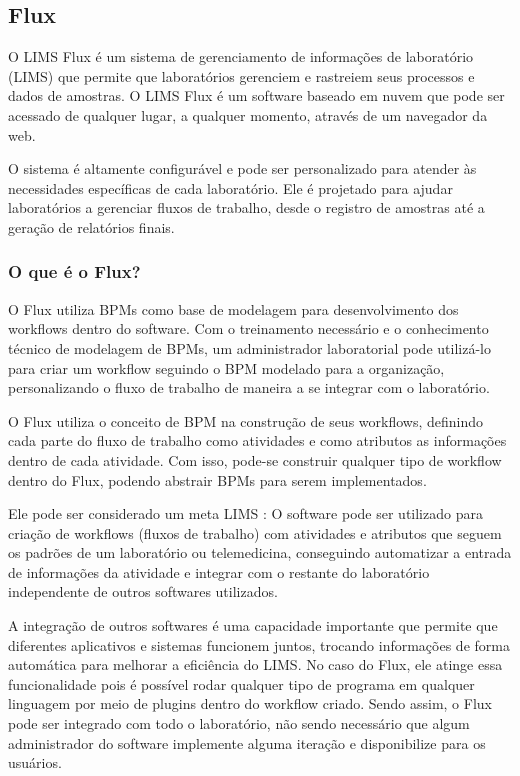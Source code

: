 \subsection{Flux} \label{sec:flux}


O LIMS Flux é um sistema de gerenciamento de informações de laboratório (LIMS) que permite que laboratórios gerenciem e rastreiem seus processos e dados de amostras. O LIMS Flux é um software baseado em nuvem que pode ser acessado de qualquer lugar, a qualquer momento, através de um navegador da web.

O sistema é altamente configurável e pode ser personalizado para atender às necessidades específicas de cada laboratório. Ele é projetado para ajudar laboratórios a gerenciar fluxos de trabalho, desde o registro de amostras até a geração de relatórios finais.

\subsubsection{O que é o Flux?}

O Flux utiliza BPMs como base de modelagem para desenvolvimento dos workflows dentro do software. Com o treinamento necessário e o conhecimento técnico de modelagem de BPMs, um administrador laboratorial pode utilizá-lo para criar um workflow seguindo o BPM modelado para a organização, personalizando o fluxo de trabalho de maneira a se integrar com o laboratório.

O Flux utiliza o conceito de BPM na construção de seus workflows, definindo cada parte do fluxo de trabalho como atividades e como atributos as informações dentro de cada atividade. Com isso, pode-se construir qualquer tipo de workflow dentro do Flux, podendo abstrair BPMs para serem implementados.

Ele pode ser considerado um meta LIMS \R: O software pode ser utilizado para criação de workflows (fluxos de trabalho) com atividades e atributos que seguem os padrões de um laboratório ou telemedicina, conseguindo automatizar a entrada de informações da atividade e integrar com o restante do laboratório independente de outros softwares utilizados.

A integração de outros softwares é uma capacidade importante que permite que diferentes aplicativos e sistemas funcionem juntos, trocando informações de forma automática para melhorar a eficiência do LIMS. No caso do Flux, ele atinge essa funcionalidade pois é possível rodar qualquer tipo de programa em qualquer linguagem por meio de plugins dentro do workflow criado.
Sendo assim, o Flux pode ser integrado com todo o laboratório, não sendo necessário que algum administrador do software implemente alguma iteração e disponibilize para os usuários.

